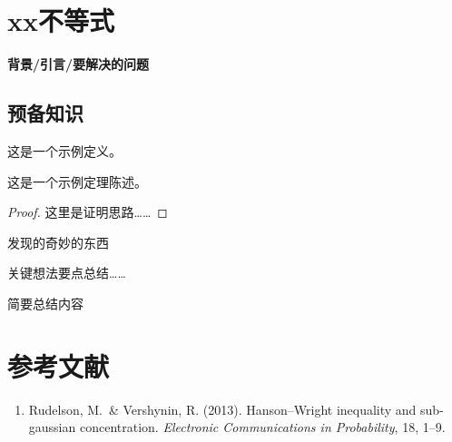 \documentclass[12pt]{article} %
\begin{document}
\ChapterHeading

\section{xx不等式}
\begin{SideBar}
\textbf{背景/引言/要解决的问题}
\end{SideBar}

\subsection{预备知识}
\begin{definition}[示例定义]
这是一个示例定义。
\end{definition}

\begin{ShadedTheorem}[示例定理]
这是一个示例定理陈述。
\end{ShadedTheorem}

\begin{proof}
这里是证明思路……
\end{proof}

\begin{RemarkNote}
发现的奇妙的东西
\end{RemarkNote}

\begin{KeyBox}
关键想法要点总结……
\end{KeyBox}

\begin{Takeaway}
简要总结内容
\end{Takeaway}

\section*{参考文献}
\begin{enumerate}
  \item Rudelson, M.\ \& Vershynin, R. (2013). Hanson--Wright inequality and sub-gaussian concentration. \textit{Electronic Communications in Probability}, 18, 1--9.
\end{enumerate}

\end{document}
